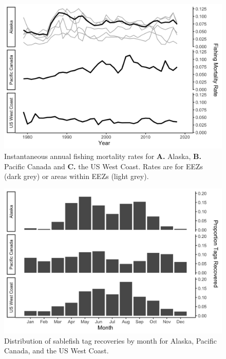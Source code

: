 \documentclass{article}
\begin{document}
\begin{figure}[htb]
    \centering
    \includegraphics[width = \textwidth]{figs/line-capture-rate}
    \caption{Instantaneous annual fishing mortality rates for \textbf{A.} Alaska, \textbf{B.} Pacific Canada and \textbf{C.} the US West Coast. Rates are for EEZs (dark grey) or areas within EEZs (light grey).}
    \label{fig:line-capture-rate}
\end{figure}

\begin{figure}[htb]
    \centering
    \includegraphics[width = \textwidth]{figs/bar-capture-scale-region}
    \caption{Distribution of sablefish tag recoveries by month for Alaska, Pacific Canada, and the US West Coast.}
    \label{fig:bar-capture-scale-region}
\end{figure}
\end{document}
